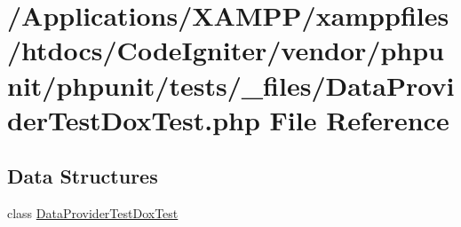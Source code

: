 \hypertarget{_data_provider_test_dox_test_8php}{}\section{/\+Applications/\+X\+A\+M\+P\+P/xamppfiles/htdocs/\+Code\+Igniter/vendor/phpunit/phpunit/tests/\+\_\+files/\+Data\+Provider\+Test\+Dox\+Test.php File Reference}
\label{_data_provider_test_dox_test_8php}
\subsection*{Data Structures}
\begin{DoxyCompactItemize}
\item 
class \mbox{\hyperlink{class_data_provider_test_dox_test}{Data\+Provider\+Test\+Dox\+Test}}
\end{DoxyCompactItemize}
